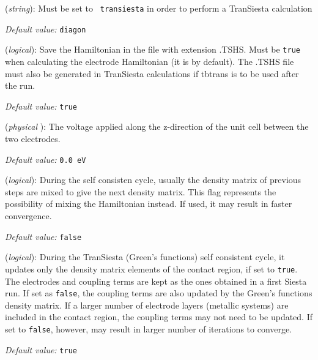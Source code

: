 \documentclass[11pt]{article}
\begin{document}
\begin{description}
    \itemsep 10pt
    \parsep 0pt

    \item[{\bf SolutionMethod}] ({\it string}):
       Must be set to {\tt
        transiesta} in order to perform a {\sc TranSiesta} calculation

        {\it Default value:} {\tt diagon}

\item[{\bf TS.SaveHS}] ({\it logical}):  Save the Hamiltonian in the file with extension .TSHS.
  Must be {\tt true} when calculating the electrode Hamiltonian (it is
  by default).  The .TSHS file must also be generated in {\sc
    TranSiesta} calculations if tbtrans is to be used after the run.

{\it Default value:} {\tt true}

\item[{\bf TS.Voltage}] ({\it physical }): The voltage applied
  along the z-direction of the unit cell between the two
  electrodes.

{\it Default value:} {\tt 0.0 eV}

\item[{\bf TS.MixH}] ({\it logical}): 
  During the self consisten cycle, usually the density matrix of
  previous steps are mixed to give the next density matrix. This flag
  represents the possibility of mixing the Hamiltonian instead. If
  used, it may result in faster convergence.

{\it Default value:} {\tt false}

\item[{\bf TS.UpdateDMCROnly}] ({\it logical}):
   During the {\sc
    TranSiesta} (Green's functions) self consistent cycle, it updates
  only the density matrix elements of the contact region, if set to
  {\tt true}. The electrodes and coupling terms are kept as the ones
  obtained in a first {\sc Siesta} run. If set as {\tt false}, the
  coupling terms are also updated by the Green's functions density
  matrix. If a larger number of electrode layers (metallic systems)
  are included in the contact region, the coupling terms may not need
  to be updated. If set to {\tt false}, however, may result in larger
  number of iterations to converge.

{\it Default value:} {\tt true}


\end{description}
\end{document}
